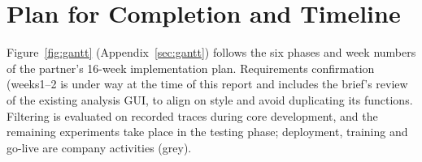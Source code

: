 \section{Plan for Completion and Timeline}
\label{sec:timeline}

Figure~\ref{fig:gantt} (Appendix~\ref{sec:gantt}) follows the six phases and week numbers of the partner's 16-week implementation plan.
Requirements confirmation (weeks1--2 is under way at the time of this report and includes the brief's review of the existing analysis GUI, to align on style and avoid duplicating its functions.
Filtering is evaluated on recorded traces during core development, and the remaining experiments take place in the testing phase; deployment, training and go-live are company activities (grey).
